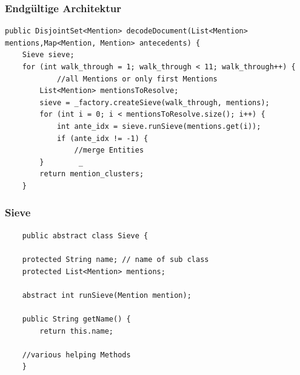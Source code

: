\documentclass[11pt,a4paper]{beamer}
\begin{document}
\begin{frame}
\frametitle{Endgültige Architektur}

\end{frame}
\begin{frame}[fragile]
\begin{lstlisting}
public DisjointSet<Mention> decodeDocument(List<Mention> mentions,Map<Mention, Mention> antecedents) {   		
    Sieve sieve;        
    for (int walk_through = 1; walk_through < 11; walk_through++) {       	
        	//all Mentions or only first Mentions  
        List<Mention> mentionsToResolve;  
        sieve = _factory.createSieve(walk_through, mentions);
        for (int i = 0; i < mentionsToResolve.size(); i++) {		    	
            int ante_idx = sieve.runSieve(mentions.get(i));
            if (ante_idx != -1) {
                //merge Entities
        }        _
	    return mention_clusters;
	}
\end{lstlisting}

\end{frame}

\begin{frame}[fragile]
\frametitle{Sieve}
\begin{lstlisting}
	public abstract class Sieve {

	protected String name; // name of sub class	
	protected List<Mention> mentions;
	 
	abstract int runSieve(Mention mention);
	
	public String getName() {
	    return this.name;
		
	//various helping Methods
	}
\end{lstlisting}
\end{frame}
\end{document}
